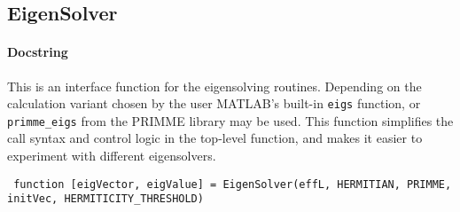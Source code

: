  \subsection{EigenSolver}
 \paragraph{Docstring} This is an interface function for the eigensolving routines. Depending on the calculation variant chosen by the user MATLAB's built-in \lstinline$eigs$ function, or \lstinline$primme_eigs$ from the PRIMME library may be used. This function simplifies the call syntax and control logic in the top-level function, and makes it easier to experiment with different eigensolvers.
 \begin{lstlisting}
 function [eigVector, eigValue] = EigenSolver(effL, HERMITIAN, PRIMME, initVec, HERMITICITY_THRESHOLD) \end{lstlisting}
